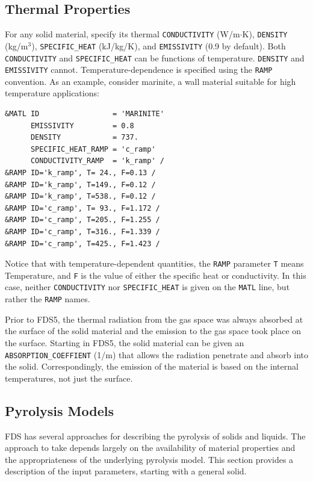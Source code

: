 \documentclass[11pt]{book}
\newcommand{\ct}{\tt\small}
\begin{document}
\subsection{Thermal Properties}

For any solid material, specify its thermal
{\ct CONDUCTIVITY} (W/m$\cdot$K), {\ct DENSITY} (kg/m$^3$),
{\ct SPECIFIC\_HEAT} (kJ/kg/K), and {\ct EMISSIVITY} (0.9 by default).
Both {\ct CONDUCTIVITY} and {\ct SPECIFIC\_HEAT} can be functions of
temperature. {\ct DENSITY} and {\ct EMISSIVITY} cannot.
Temperature-dependence is specified using the {\ct RAMP} convention.
As an example, consider marinite, a wall material suitable for high temperature applications:

\footnotesize
\begin{verbatim}
&MATL ID                 = 'MARINITE'
      EMISSIVITY         = 0.8
      DENSITY            = 737.
      SPECIFIC_HEAT_RAMP = 'c_ramp'
      CONDUCTIVITY_RAMP  = 'k_ramp' /
&RAMP ID='k_ramp', T= 24., F=0.13 /
&RAMP ID='k_ramp', T=149., F=0.12 /
&RAMP ID='k_ramp', T=538., F=0.12 /
&RAMP ID='c_ramp', T= 93., F=1.172 /
&RAMP ID='c_ramp', T=205., F=1.255 /
&RAMP ID='c_ramp', T=316., F=1.339 /
&RAMP ID='c_ramp', T=425., F=1.423 /
\end{verbatim}
\normalsize
Notice that with temperature-dependent quantities, the {\ct RAMP} parameter
{\ct T} means Temperature, and {\ct F} is the value of either
the specific heat or conductivity. In this case, neither {\ct CONDUCTIVITY} nor {\ct SPECIFIC\_HEAT} is given on the
{\ct MATL} line, but rather the {\ct RAMP} names.

Prior to FDS5, the thermal radiation from the gas space was always
absorbed at the surface of the solid material and the emission to the
gas space took place on the surface. Starting in FDS5, the solid
material can be given an {\ct ABSORPTION\_COEFFIENT} (1/m) that allows
the radiation penetrate and absorb into the solid. Correspondingly,
the emission of the material is based on the internal temperatures,
not just the surface.

\subsection{Pyrolysis Models}

FDS has several approaches for describing the pyrolysis of solids and liquids. The approach to take depends largely
on the availability of material properties and the appropriateness of the underlying pyrolysis model. This
section provides a description of the input parameters, starting with a general solid.
\end{document}
